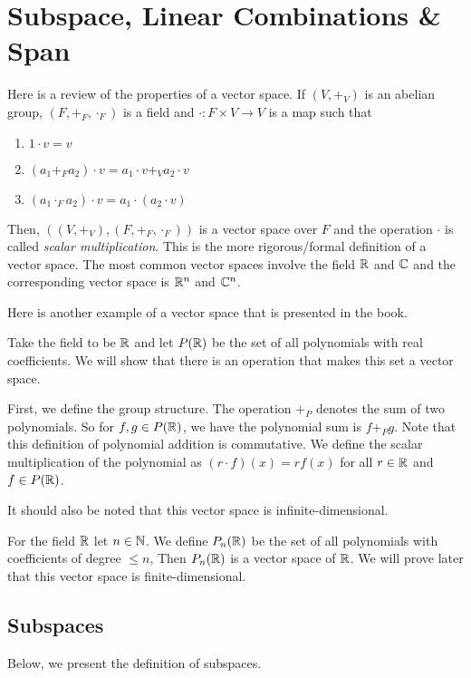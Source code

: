 \documentclass[main.tex]{subfiles}
\begin{document}
    \chapter{Subspace, Linear Combinations \& Span}

    Here is a review of the properties of a vector space. If $(V, +_V)$ is an abelian group, $(F, +_F, \cdot_F)$ is a field and $\cdot : F\times V \to V$ is a map such that 
    \begin{enumerate}
        \item $1\cdot v = v$
        \item $(a_1 +_F a_2) \cdot v = a_1\cdot v +_V a_2\cdot v$
        \item $(a_1\cdot _F a_2)\cdot v = a_1 \cdot (a_2 \cdot v)$
    \end{enumerate}
    Then, $((V, +_V), (F, +_F, \cdot_F))$ is a vector space over $F$ and the operation $\cdot$ is called \emph{scalar multiplication}. This is the more rigorous/formal definition of a vector space. The most common vector spaces involve the field $\mathbb{R}$ and $\mathbb{C}$ and the corresponding vector space is $\mathbb{R}^n$ and $\mathbb{C}^n$. \par 

    Here is another example of a vector space that is presented in the book. 
    \begin{example}{}{}
        Take the field to be $\mathbb{R}$ and let $P(\mathbb{R})$ be the set of all polynomials with real coefficients. We will show that there is an operation that makes this set a vector space. \bigbreak 

        First, we define the group structure. The operation $+_P$ denotes the sum of two polynomials. So for $f,g\in P(\mathbb{R})$, we have the polynomial sum is $f +_P g$. Note that this definition of polynomial addition is commutative. We define the scalar multiplication of the polynomial as $(r\cdot f)(x) = rf(x)$ for all $r\in \mathbb{R}$ and $f\in P(\mathbb{R})$. \bigbreak 

        It should also be noted that this vector space is infinite-dimensional. 
    \end{example}

    \begin{example}{}{}
        For the field $\mathbb{R}$ let $n\in \mathbb{N}$. We define $P_n(\mathbb{R})$ be the set of all polynomials with coefficients of degree $\leq n$, Then $P_n(\mathbb{R})$ is a vector space of $\mathbb{R}$. We will prove later that this vector space is finite-dimensional.
    \end{example}

    \section{Subspaces}
    Below, we present the definition of subspaces. 
\end{document}
